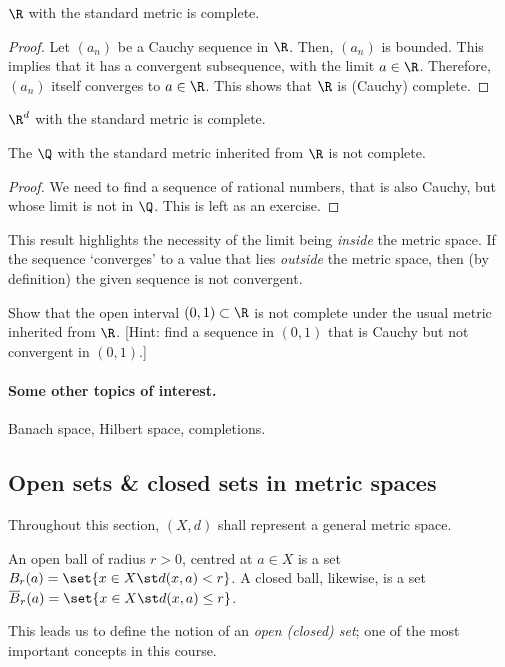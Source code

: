 \begin{nprop}
  $\R$ with the standard metric is complete.
\end{nprop}
\begin{proof}
  Let $(a_n)$ be a Cauchy sequence in $\R$. Then, $(a_n)$ is bounded. This implies that it has a convergent subsequence, with the limit $a \in \R$. Therefore, $(a_n)$ itself converges to $a \in \R$. This shows that $\R$ is (Cauchy) complete.
\end{proof}

\begin{nprop}
  $\R^d$ with the standard metric is complete.
\end{nprop}

\begin{nprop}
  The $\Q$ with the standard metric inherited from $\R$ is not complete.
\end{nprop}
\begin{proof}
  We need to find a sequence of rational numbers, that is also Cauchy, but whose limit is not in $\Q$. This is left as an exercise.
\end{proof}
This result highlights the necessity of the limit being \emph{inside} the metric space. If the sequence `converges' to a value that lies \emph{outside} the metric space, then (by definition) the given sequence is not convergent.

\begin{nex}
  Show that the open interval $(0,1) \subset \R$ is not complete under the usual metric inherited from $\R$. [Hint: find a sequence in $(0,1)$ that is Cauchy but not convergent in $(0,1)$.]
\end{nex}

\paragraph{Some other topics of interest.} Banach space, Hilbert space, completions.

\subsection{Open sets \& closed sets in metric spaces}
Throughout this section, $(X,d)$ shall represent a general metric space.

\begin{ndfn}
  An open ball of radius $r>0$, centred at $a \in X$ is a set $\oB_{r}(a) = \set{x \in X \st d(x,a) < r}$. A closed ball, likewise, is a set $\cB_{r}(a) = \set{x \in X \st d(x,a) \leq r}$.
\end{ndfn}
This leads us to define the notion of an \emph{open (closed) set}; one of the most important concepts in this course.

